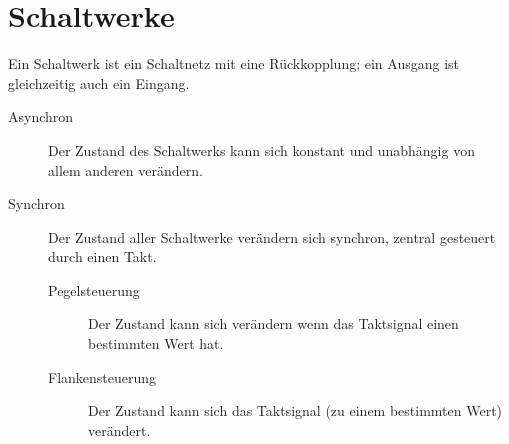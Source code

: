 \documentclass{article}
\begin{document}
\section{Schaltwerke} 
Ein Schaltwerk ist ein Schaltnetz mit eine Rückkopplung; ein Ausgang ist gleichzeitig auch ein Eingang.
\begin{description}
 \item[Asynchron] Der Zustand des Schaltwerks kann sich konstant und unabhängig von allem anderen verändern.
 \item[Synchron] Der Zustand aller Schaltwerke verändern sich synchron, zentral gesteuert durch einen Takt. 
 \begin{description}
  \item[Pegelsteuerung] Der Zustand kann sich verändern wenn das Taktsignal einen bestimmten Wert hat. 
  \item[Flankensteuerung] Der Zustand kann sich das Taktsignal (zu einem bestimmten Wert) verändert.
 \end{description}
\end{description}
\end{document}
